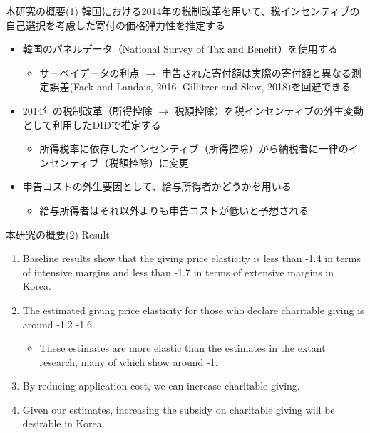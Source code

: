 \documentclass[
  ignorenonframetext,
  aspectratio=169,
]{beamer}
\providecommand{\tightlist}{%
  \setlength{\itemsep}{0pt}\setlength{\parskip}{0pt}}
\begin{document}
\begin{frame}{本研究の概要(1)}
\protect\hypertarget{ux672cux7814ux7a76ux306eux6982ux89811}{}
韓国における2014年の税制改革を用いて、税インセンティブの自己選択を考慮した寄付の価格弾力性を推定する

\begin{itemize}
\tightlist
\item
  韓国のパネルデータ（National Survey of Tax and Benefit）を使用する

  \begin{itemize}
  \tightlist
  \item
    サーベイデータの利点 \(\to\) 申告された寄付額は実際の寄付額と異なる測定誤差(Fack and Landais, 2016; Gillitzer and Skov, 2018)を回避できる
  \end{itemize}
\item
  2014年の税制改革（所得控除 \(\to\) 税額控除）を税インセンティブの外生変動として利用したDIDで推定する

  \begin{itemize}
  \tightlist
  \item
    所得税率に依存したインセンティブ（所得控除）から納税者に一律のインセンティブ（税額控除）に変更
  \end{itemize}
\item
  申告コストの外生要因として、給与所得者かどうかを用いる

  \begin{itemize}
  \tightlist
  \item
    給与所得者はそれ以外よりも申告コストが低いと予想される
  \end{itemize}
\end{itemize}
\end{frame}

\begin{frame}{本研究の概要(2)}
\protect\hypertarget{ux672cux7814ux7a76ux306eux6982ux89812}{}
Result

\begin{enumerate}
\tightlist
\item
  Baseline results show that the giving price elasticity is less than -1.4 in terms of intensive margins and less than -1.7 in terms of extensive margins in Korea.
\item
  The estimated giving price elasticity for those who declare charitable giving is around -1.2 -1.6.

  \begin{itemize}
  \tightlist
  \item
    These estimates are more elastic than the estimates in the extant research, many of which show around -1.
  \end{itemize}
\item
  By reducing application cost, we can increase charitable giving.
\item
  Given our estimates, increasing the subsidy on charitable giving will be desirable in Korea.
\end{enumerate}
\end{frame}
\end{document}
